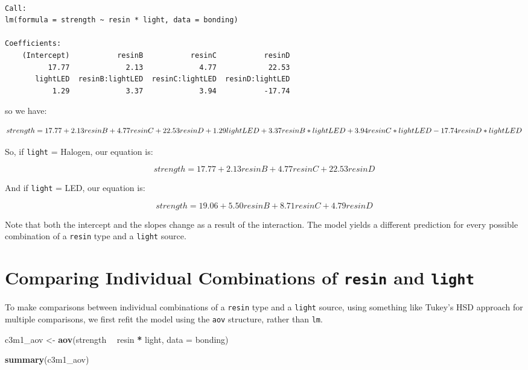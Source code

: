 \documentclass[]{book}
\newenvironment{Shaded}{\begin{snugshade}}{\end{snugshade}}
\newcommand{\KeywordTok}[1]{\textcolor[rgb]{0.13,0.29,0.53}{\textbf{#1}}}
\newcommand{\DataTypeTok}[1]{\textcolor[rgb]{0.13,0.29,0.53}{#1}}
\newcommand{\StringTok}[1]{\textcolor[rgb]{0.31,0.60,0.02}{#1}}
\newcommand{\OperatorTok}[1]{\textcolor[rgb]{0.81,0.36,0.00}{\textbf{#1}}}
\newcommand{\NormalTok}[1]{#1}
\theoremstyle{definition}
\theoremstyle{definition}
\theoremstyle{definition}
\theoremstyle{remark}
\begin{document}
\begin{verbatim}

Call:
lm(formula = strength ~ resin * light, data = bonding)

Coefficients:
    (Intercept)           resinB           resinC           resinD  
          17.77             2.13             4.77            22.53  
       lightLED  resinB:lightLED  resinC:lightLED  resinD:lightLED  
           1.29             3.37             3.94           -17.74  
\end{verbatim}

so we have:

\[
strength = 17.77 + 2.13 resinB + 4.77 resinC + 22.53 resinD \\
+ 1.29 lightLED + 3.37 resinB*lightLED \\
+ 3.94 resinC*lightLED - 17.74 resinD*lightLED
\]

So, if \texttt{light} = Halogen, our equation is:

\[
strength = 17.77 + 2.13 resinB + 4.77 resinC + 22.53 resinD 
\]

And if \texttt{light} = LED, our equation is:

\[
strength = 19.06 + 5.50 resinB + 8.71 resinC + 4.79 resinD 
\]

Note that both the intercept and the slopes change as a result of the
interaction. The model yields a different prediction for every possible
combination of a \texttt{resin} type and a \texttt{light} source.

\section{\texorpdfstring{Comparing Individual Combinations of
\texttt{resin} and
\texttt{light}}{Comparing Individual Combinations of resin and light}}\label{comparing-individual-combinations-of-resin-and-light}

To make comparisons between individual combinations of a \texttt{resin}
type and a \texttt{light} source, using something like Tukey's HSD
approach for multiple comparisons, we first refit the model using the
\texttt{aov} structure, rather than \texttt{lm}.

\begin{Shaded}
\begin{Highlighting}[]
\NormalTok{c3m1_aov <-}\StringTok{ }\KeywordTok{aov}\NormalTok{(strength }\OperatorTok{~}\StringTok{ }\NormalTok{resin }\OperatorTok{*}\StringTok{ }\NormalTok{light, }\DataTypeTok{data =}\NormalTok{ bonding)}

\KeywordTok{summary}\NormalTok{(c3m1_aov)}
\end{Highlighting}
\end{Shaded}
\end{document}
